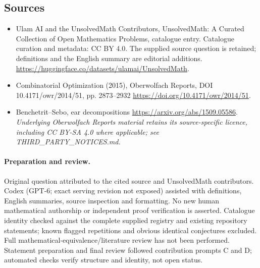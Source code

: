 \documentclass[11pt]{article}
\begin{document}
\subsection{Sources}
\begin{itemize}
\item[\hypertarget{source:statement:1}{S1}] Ulam AI and the UnsolvedMath Contributors, UnsolvedMath: A Curated Collection of Open Mathematics Problems, catalogue entry. Catalogue curation and metadata: CC BY 4.0. The supplied source question is retained; definitions and the English summary are editorial additions.
\url{https://huggingface.co/datasets/ulamai/UnsolvedMath}.
\item[\hypertarget{source:statement:2}{S2}] Combinatorial Optimization (2015), Oberwolfach Reports, DOI 10.4171/owr/2014/51, pp. 2873--2932
\url{https://doi.org/10.4171/owr/2014/51}.
\item[\hypertarget{source:statement:3}{S3}] Benchetrit--Sebo, ear decompositions
\url{https://arxiv.org/abs/1509.05586}.
\textit{Underlying Oberwolfach Reports material retains its source-specific licence, including CC BY-SA 4.0 where applicable; see THIRD\_PARTY\_NOTICES.md.}
\end{itemize}
\paragraph{Preparation and review.}
Original question attributed to the cited source and UnsolvedMath contributors. Codex (GPT-6; exact serving revision not exposed) assisted with definitions, English summaries, source inspection and formatting. No new human mathematical authorship or independent proof verification is asserted. Catalogue identity checked against the complete supplied registry and existing repository statements; known flagged repetitions and obvious identical conjectures excluded. Full mathematical-equivalence/literature review has not been performed. Statement preparation and final review followed contribution prompts C and D; automated checks verify structure and identity, not open status.
\label{end:statement}
\end{document}
